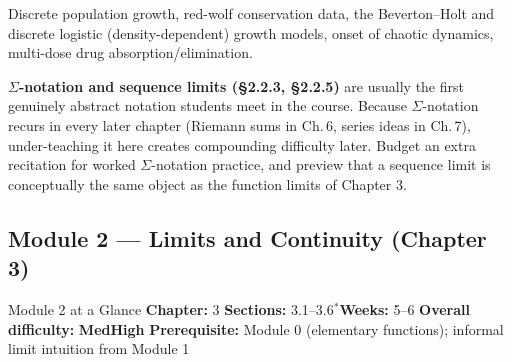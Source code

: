 \documentclass[11pt]{article}
\newcommand{\diffM}{\textcolor{diffamberc}{\textbf{Med}}}
\newcommand{\diffH}{\textcolor{diffredc}{\textbf{High}}}
\newcommand{\opt}{$^{\ast}$}
\begin{document}
\begin{appbox}
Discrete population growth, red-wolf conservation data, the Beverton--Holt and discrete
logistic (density-dependent) growth models, onset of chaotic dynamics, multi-dose drug
absorption/elimination.
\end{appbox}

\begin{diffbox}
\textbf{$\Sigma$-notation and sequence limits (\S2.2.3, \S2.2.5)} are usually the first
genuinely abstract notation students meet in the course. Because $\Sigma$-notation recurs
in every later chapter (Riemann sums in Ch.\,6, series ideas in Ch.\,7), under-teaching it
here creates compounding difficulty later. Budget an extra recitation for worked
$\Sigma$-notation practice, and preview that a sequence limit is conceptually the same
object as the function limits of Chapter 3.
\end{diffbox}

\subsection*{Module 2 --- Limits and Continuity (Chapter 3)}

\begin{modulebox}{Module 2 at a Glance}{}
\textbf{Chapter:} 3 \quad\textbf{Sections:} 3.1--3.6\opt \quad\textbf{Weeks:} 5--6 \quad
\textbf{Overall difficulty:} \diffM\text{--}\diffH \quad
\textbf{Prerequisite:} Module 0 (elementary functions); informal limit intuition from
Module 1
\end{modulebox}
\end{document}
